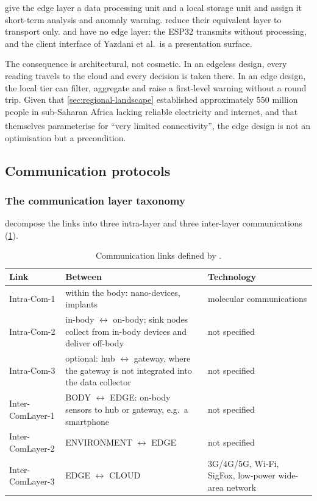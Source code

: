 \documentclass[12pt,a4paper,oneside]{report}
\newcommand{\bq}[1]{``#1''\textsuperscript{\dag}}
\begin{document}
\Textcite{mucchi2021} give the edge layer a data processing unit and a local storage unit and assign it short-term analysis and anomaly warning. \Textcite{liu2025review} reduce their equivalent layer to transport only. \Textcite{efendi2025} and \textcite{yazdani2018} have no edge layer: the ESP32 transmits without processing, and the client interface of Yazdani et al.\ is a presentation surface.

The consequence is architectural, not cosmetic. In an edgeless design, every reading travels to the cloud and every decision is taken there. In an edge design, the local tier can filter, aggregate and raise a first-level warning without a round trip. Given that \cref{sec:regional-landscape} established approximately 550 million people in sub-Saharan Africa lacking reliable electricity and internet, and that \textcite{mucchi2021} themselves parameterise for \bq{very limited connectivity}, the edge design is not an optimisation but a precondition.

\subsection{Communication protocols}\label{sec:protocols-cloud}

\subsubsection{The communication layer taxonomy}

\Textcite{mucchi2021} decompose the links into three intra-layer and three inter-layer communications (\cref{tab:comm-links}).

\begin{table}[htbp]
\centering\footnotesize
\caption{Communication links defined by \textcite{mucchi2021}.}\label{tab:comm-links}
\begin{tabularx}{\textwidth}{@{}>{\raggedright\arraybackslash}p{3.0cm} X >{\raggedright\arraybackslash}p{4.1cm}@{}}
\toprule
\textbf{Link} & \textbf{Between} & \textbf{Technology} \\
\midrule
Intra-Com-1 & within the body: nano-devices, implants & molecular communications \\
Intra-Com-2 & in-body $\leftrightarrow$ on-body; sink nodes collect from in-body devices and deliver off-body & not specified \\
Intra-Com-3 & optional: hub $\leftrightarrow$ gateway, where the gateway is not integrated into the data collector & not specified \\
Inter-ComLayer-1 & BODY $\leftrightarrow$ EDGE: on-body sensors to hub or gateway, e.g.\ a smartphone & not specified \\
Inter-ComLayer-2 & ENVIRONMENT $\leftrightarrow$ EDGE & not specified \\
Inter-ComLayer-3 & EDGE $\leftrightarrow$ CLOUD & 3G/4G/5G, Wi-Fi, SigFox, low-power wide-area network \\
\bottomrule
\end{tabularx}
\end{table}
\end{document}
